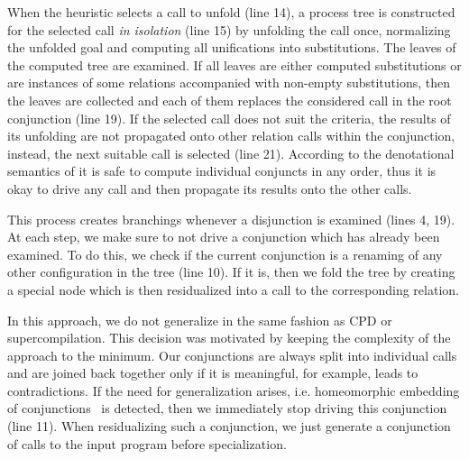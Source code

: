 When the heuristic selects a call to unfold (line 14), a process tree is constructed for the selected call \emph{in isolation} (line 15) by unfolding the call once, normalizing the unfolded goal and computing all unifications into substitutions.
The leaves of the computed tree are examined.
If all leaves are either computed substitutions or are instances of some relations accompanied with non-empty substitutions, then the leaves are collected and each of them replaces the considered call in the root conjunction (line 19).
If the selected call does not suit the criteria, the results of its unfolding are not propagated onto other relation calls within the conjunction, instead, the next suitable call is selected (line 21).
According to the denotational semantics of \mk it is safe to compute individual conjuncts in any order, thus it is okay to drive any call and then propagate its results onto the other calls.


This process creates branchings whenever a disjunction is examined (lines 4, 19).
At each step, we make sure to not drive a conjunction which has already been examined.
To do this, we check if the current conjunction is a renaming of any other configuration in the tree (line 10).
If it is, then we fold the tree by creating a special node which is then residualized into a call to the corresponding relation.

In this approach, we do not generalize in the same fashion as CPD or supercompilation.
This decision was motivated by keeping the complexity of the approach to the minimum.
Our conjunctions are always split into individual calls and are joined back together only if it is meaningful, for example, leads to contradictions.
If the need for generalization arises, i.e. homeomorphic embedding of conjunctions~\cite{de1999conjunctive} is detected, then we immediately stop driving this conjunction (line 11).
When residualizing such a conjunction, we just generate a conjunction of calls to the input program before specialization.



